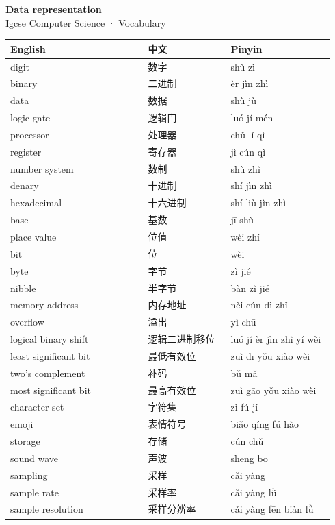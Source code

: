 \documentclass[11pt]{article}
\begin{document}
\begin{center}
  {\LARGE\bfseries Data representation}\\[0.35em]
  {\large Igcse Computer Science · Vocabulary}
\end{center}
\vspace{0.6em}

\begin{longtable}{@{}p{0.40\linewidth}p{0.24\linewidth}p{0.30\linewidth}@{}}
\toprule
\textbf{English} & \textbf{中文} & \textbf{Pinyin} \\
\midrule
\endhead
\bottomrule
\endlastfoot
digit & 数字 & shù zì \\
binary & 二进制 & èr jìn zhì \\
data & 数据 & shù jù \\
logic gate & 逻辑门 & luó jí mén \\
processor & 处理器 & chǔ lǐ qì \\
register & 寄存器 & jì cún qì \\
number system & 数制 & shù zhì \\
denary & 十进制 & shí jìn zhì \\
hexadecimal & 十六进制 & shí liù jìn zhì \\
base & 基数 & jī shù \\
place value & 位值 & wèi zhí \\
bit & 位 & wèi \\
byte & 字节 & zì jié \\
nibble & 半字节 & bàn zì jié \\
memory address & 内存地址 & nèi cún dì zhǐ \\
overflow & 溢出 & yì chū \\
logical binary shift & 逻辑二进制移位 & luó jí èr jìn zhì yí wèi \\
least significant bit & 最低有效位 & zuì dī yǒu xiào wèi \\
two's complement & 补码 & bǔ mǎ \\
most significant bit & 最高有效位 & zuì gāo yǒu xiào wèi \\
character set & 字符集 & zì fú jí \\
emoji & 表情符号 & biǎo qíng fú hào \\
storage & 存储 & cún chǔ \\
sound wave & 声波 & shēng bō \\
sampling & 采样 & cǎi yàng \\
sample rate & 采样率 & cǎi yàng lǜ \\
sample resolution & 采样分辨率 & cǎi yàng fēn biàn lǜ \\

\end{longtable}
\end{document}
